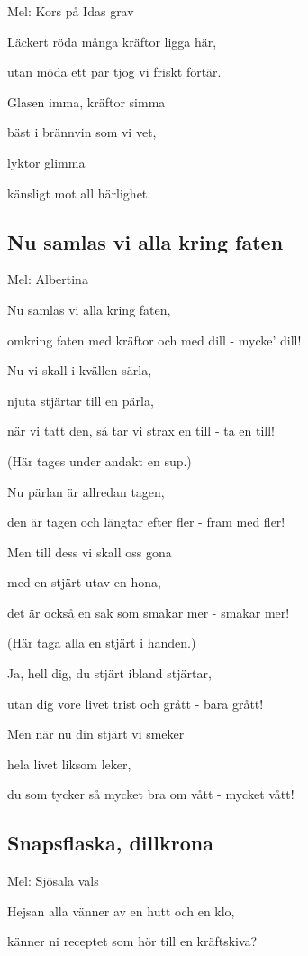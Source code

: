 Mel: Kors på Idas grav\bigskip

Läckert röda många kräftor ligga här,

utan möda ett par tjog vi friskt förtär.

Glasen imma, kräftor simma

bäst i brännvin som vi vet,

lyktor glimma

känsligt mot all härlighet.

\subsection{\textbf{Nu samlas vi alla kring faten}}

Mel: Albertina\bigskip


Nu samlas vi alla kring faten,

omkring faten med kräftor och med dill - mycke’ dill!

Nu vi skall i kvällen särla,

njuta stjärtar till en pärla,

när vi tatt den, så tar vi strax en till - ta en till!

(Här tages under andakt en sup.)

Nu pärlan är allredan tagen,

den är tagen och längtar efter fler - fram med fler!

Men till dess vi skall oss gona

med en stjärt utav en hona,

det är också en sak som smakar mer - smakar mer!

(Här taga alla en stjärt i handen.)

Ja, hell dig, du stjärt ibland stjärtar,

utan dig vore livet trist och grått - bara grått!

Men när nu din stjärt vi smeker

hela livet liksom leker,

du som tycker så mycket bra om vått - mycket vått!

\subsection{\textbf{Snapsflaska, dillkrona}}

Mel: Sjösala vals\bigskip


Hejsan alla vänner av en hutt och en klo,

känner ni receptet som hör till en kräftskiva?

